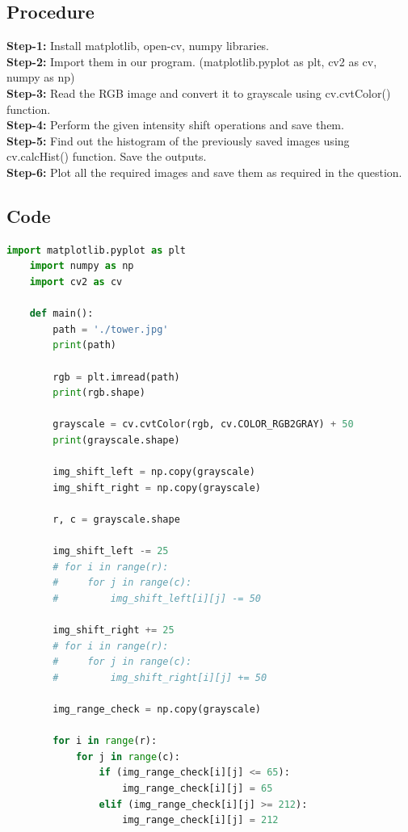 \documentclass{article}
\begin{document}
{    \subsection{Procedure}
    \textbf{Step-1:}
    Install matplotlib, open-cv, numpy libraries.\\
    \textbf{Step-2:}
    Import them in our program. (matplotlib.pyplot as plt, cv2 as cv, numpy as np)\\
    \textbf{Step-3:}
    Read the RGB image and convert it to grayscale using cv.cvtColor() function.\\
    \textbf{Step-4:}
    Perform the given intensity shift operations and save them.\\
    \textbf{Step-5:}
    Find out the histogram of the previously saved images using cv.calcHist() function. Save the outputs.\\
    \textbf{Step-6:}
    Plot all the required images and save them as required in the question.\\
    
    \subsection{Code}
    \lstset{style=mystyle}
    \begin{lstlisting}[language=Python, caption=Code for shifting histogram]
    import matplotlib.pyplot as plt
    import numpy as np
    import cv2 as cv
    
    def main():
        path = './tower.jpg'
        print(path)
    
        rgb = plt.imread(path)
        print(rgb.shape)
    
        grayscale = cv.cvtColor(rgb, cv.COLOR_RGB2GRAY) + 50
        print(grayscale.shape)
    
        img_shift_left = np.copy(grayscale)
        img_shift_right = np.copy(grayscale)
    
        r, c = grayscale.shape
    
        img_shift_left -= 25
        # for i in range(r):
        #     for j in range(c):
        #         img_shift_left[i][j] -= 50
        
        img_shift_right += 25
        # for i in range(r):
        #     for j in range(c):
        #         img_shift_right[i][j] += 50
    
        img_range_check = np.copy(grayscale)
        
        for i in range(r):
            for j in range(c):
                if (img_range_check[i][j] <= 65):
                    img_range_check[i][j] = 65
                elif (img_range_check[i][j] >= 212):
                    img_range_check[i][j] = 212
    

\end{lstlisting}}
\end{document}
